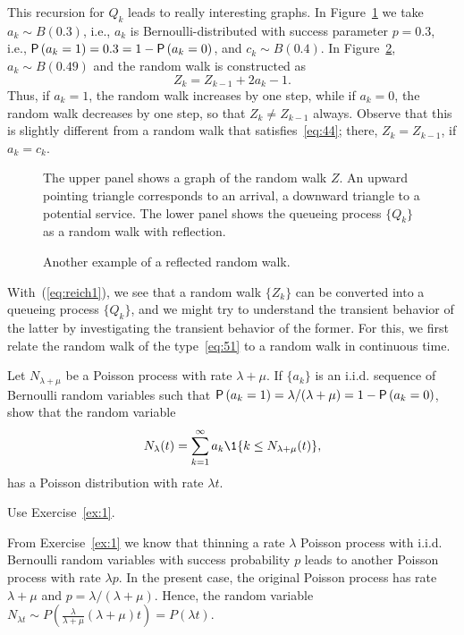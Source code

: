 This recursion for $Q_k$ leads to really interesting graphs. In Figure~\ref{fig:random_bernoulli}
 we take $a_k \sim B(0.3)$, i.e., $a_k$ is Bernoulli-distributed with success
parameter $p=0.3$, i.e., $\P{a_k = 1} = 0.3 = 1- \P{a_k=0}$, and
$c_k \sim B(0.4)$. In Figure~\ref{fig:random_walk},  $a_k\sim B(0.49)$ and
the random walk is constructed as
\begin{equation}\label{eq:51}
  Z_k = Z_{k-1} + 2 a_k -1.
\end{equation}
Thus, if $a_k=1$, the random walk increases by one step, while if $a_k=0$, the random walk decreases by one step, so that $Z_k \neq Z_{k-1}$  always. Observe that this is slightly different from a random walk that satisfies~\eqref{eq:44}; there, $Z_{k}=Z_{k-1}$, if $a_k=c_k$.


\begin{figure}[ht]
  \centering

%
\caption{The upper panel shows a graph of the random walk $Z$. An
  upward pointing triangle corresponds to an arrival, a downward
  triangle to a potential service. The lower panel shows the queueing
  process $\{Q_k\}$ as a random walk with reflection.}
\label{fig:random_bernoulli}
\end{figure}

\begin{figure}[ht]
  \centering

\caption{Another example of a reflected random walk.}
\label{fig:random_walk}
\end{figure}


With~(\ref{eq:reich1}),  we see that a random walk $\{Z_k\}$ can be converted into a queueing
process $\{Q_k\}$, and we might try to understand the transient behavior of the latter by investigating the transient behavior of the former.  For this, we first relate the random walk of the type~\eqref{eq:51} to a random walk in continuous time. 

\begin{exercise}[\faCalculator]
  Let $N_{\lambda+\mu}$ be a Poisson process with rate $\lambda+\mu$. If $\{a_k\}$ is an i.i.d. sequence of Bernoulli random variables such that $\P{a_k=1} = \lambda/(\lambda+\mu)=1-\P{a_k=0}$, show that the random variable
  \begin{equation*}
    N_\lambda(t) = \sum_{k=1}^\infty a_k \1{k \leq N_{\lambda+\mu}(t)},
  \end{equation*}
has a Poisson distribution with rate $\lambda t$. 
\begin{hint}
Use Exercise~\ref{ex:1}.
\end{hint}
\begin{solution}
  From Exercise~\ref{ex:1} we know that thinning  a rate $\lambda$ Poisson process  with i.i.d. Bernoulli random variables with success probability $p$  leads to another Poisson process with rate $\lambda p$. In the present case, the original Poisson process has rate $\lambda+\mu$ and $p=\lambda/(\lambda+\mu)$. Hence, the random variable $N_{\lambda t}\sim P\left(\frac\lambda{\lambda+\mu} (\lambda+\mu)t\right) = P(\lambda t)$.
\end{solution}
\end{exercise}


